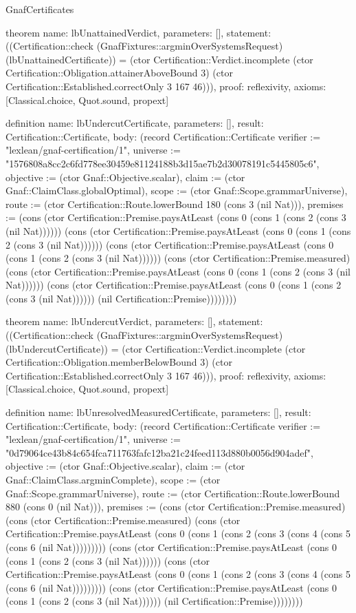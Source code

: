 \begin{lexlean}{GnafCertificates}
\begin{semanticmodule}
theorem{
  name: lbUnattainedVerdict,
  parameters: [],
  statement: ((Certification::check (GnafFixtures::argminOverSystemsRequest) (lbUnattainedCertificate)) = (ctor Certification::Verdict.incomplete (ctor Certification::Obligation.attainerAboveBound 3) (ctor Certification::Established.correctOnly 3 167 46))),
  proof: reflexivity{},
  axioms: [Classical.choice, Quot.sound, propext]
}

definition{
  name: lbUndercutCertificate,
  parameters: [],
  result: Certification::Certificate,
  body: (record Certification::Certificate {verifier := "lexlean/gnaf-certification/1", universe := "1576808a8cc2c6fd778ee30459e81124188b3d15ae7b2d30078191c5445805c6", objective := (ctor Gnaf::Objective.scalar), claim := (ctor Gnaf::ClaimClass.globalOptimal), scope := (ctor Gnaf::Scope.grammarUniverse), route := (ctor Certification::Route.lowerBound 180 (cons 3 (nil Nat))), premises := (cons (ctor Certification::Premise.paysAtLeast (cons 0 (cons 1 (cons 2 (cons 3 (nil Nat)))))) (cons (ctor Certification::Premise.paysAtLeast (cons 0 (cons 1 (cons 2 (cons 3 (nil Nat)))))) (cons (ctor Certification::Premise.paysAtLeast (cons 0 (cons 1 (cons 2 (cons 3 (nil Nat)))))) (cons (ctor Certification::Premise.measured) (cons (ctor Certification::Premise.paysAtLeast (cons 0 (cons 1 (cons 2 (cons 3 (nil Nat)))))) (cons (ctor Certification::Premise.paysAtLeast (cons 0 (cons 1 (cons 2 (cons 3 (nil Nat)))))) (nil Certification::Premise)))))))})
}

theorem{
  name: lbUndercutVerdict,
  parameters: [],
  statement: ((Certification::check (GnafFixtures::argminOverSystemsRequest) (lbUndercutCertificate)) = (ctor Certification::Verdict.incomplete (ctor Certification::Obligation.memberBelowBound 3) (ctor Certification::Established.correctOnly 3 167 46))),
  proof: reflexivity{},
  axioms: [Classical.choice, Quot.sound, propext]
}

definition{
  name: lbUnresolvedMeasuredCertificate,
  parameters: [],
  result: Certification::Certificate,
  body: (record Certification::Certificate {verifier := "lexlean/gnaf-certification/1", universe := "0d79064ce43b84c654fca711763fafc12ba21c24feed113d880b0056d904adef", objective := (ctor Gnaf::Objective.scalar), claim := (ctor Gnaf::ClaimClass.argminComplete), scope := (ctor Gnaf::Scope.grammarUniverse), route := (ctor Certification::Route.lowerBound 880 (cons 0 (nil Nat))), premises := (cons (ctor Certification::Premise.measured) (cons (ctor Certification::Premise.measured) (cons (ctor Certification::Premise.paysAtLeast (cons 0 (cons 1 (cons 2 (cons 3 (cons 4 (cons 5 (cons 6 (nil Nat))))))))) (cons (ctor Certification::Premise.paysAtLeast (cons 0 (cons 1 (cons 2 (cons 3 (nil Nat)))))) (cons (ctor Certification::Premise.paysAtLeast (cons 0 (cons 1 (cons 2 (cons 3 (cons 4 (cons 5 (cons 6 (nil Nat))))))))) (cons (ctor Certification::Premise.paysAtLeast (cons 0 (cons 1 (cons 2 (cons 3 (nil Nat)))))) (nil Certification::Premise)))))))})
}


\end{semanticmodule}
\end{lexlean}
